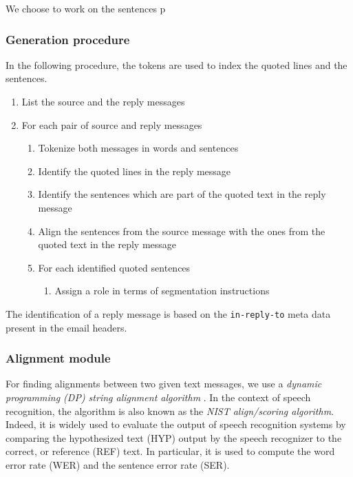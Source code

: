 We choose to work on the sentences p



\subsubsection{Generation procedure}
\label{}

In the following procedure, the tokens are used to index the quoted lines and the sentences. 




\begin{enumerate}
\item List the source and the reply messages
\item For each pair of source and reply messages
\begin{enumerate}
\item Tokenize both messages in words and sentences
\item Identify %
the quoted lines in the reply message
\item Identify the sentences which are part of the quoted text in the reply message
\item Align the sentences from the source message with the ones from the quoted text in the reply message 
\item For each identified quoted sentences 
\begin{enumerate}
\item Assign a role in terms of segmentation instructions
\end{enumerate}
\end{enumerate}
\end{enumerate}

The identification of a reply message is based on the \texttt{in-reply-to} meta data present in the email headers.



\subsubsection{Alignment module}
\label{}



For finding alignments between two given text messages, we use 
a \textit{dynamic programming (DP) string alignment algorithm} \cite{sankoff:1983}. 
In the context of speech recognition, the algorithm is also known as the \textit{NIST align/scoring algorithm}. Indeed, it is widely used to evaluate the output of speech recognition systems by comparing the hypothesized text (HYP) output by the speech recognizer to the correct, or reference (REF) text. 
In particular, it is used to compute the word error rate (WER) and the sentence error rate (SER).

